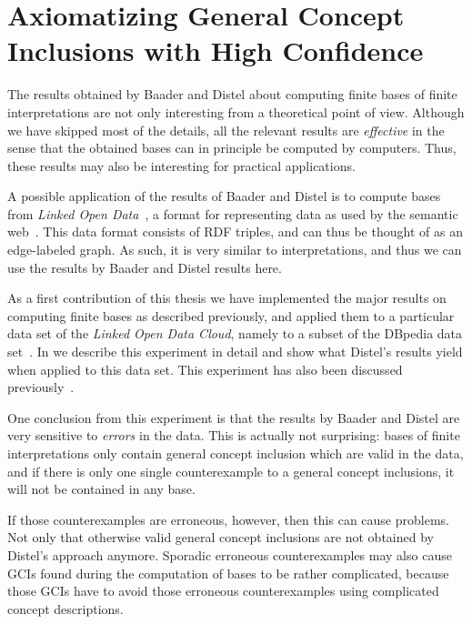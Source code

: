 \chapter{Axiomatizing General Concept Inclusions with High Confidence}
\label{cha:axiom-conf-el}

The results obtained by Baader and Distel about computing finite bases of finite
interpretations are not only interesting from a theoretical point of view.  Although we
have skipped most of the details, all the relevant results are \emph{effective} in the
sense that the obtained bases can in principle be computed by computers.  Thus, these
results may also be interesting for practical applications.

A possible application of the results of Baader and Distel is to compute bases from
\emph{Linked Open Data}~\cite{Linked-Data}, a format for representing data as used by the
semantic web~\cite{journal/sciam/BernersLeeHL01,DBLP:conf/dagstuhl/2003sweb,FOST}.  This
data format consists of RDF triples, and can thus be thought of as an edge-labeled graph.
As such, it is very similar to interpretations, and thus we can use the results by Baader
and Distel results here.

As a first contribution of this thesis we have implemented the major results on computing
finite bases as described previously, and applied them to a particular data set of the
\emph{Linked Open Data Cloud}, namely to a subset of the DBpedia data set~\cite{DBpedia}.
In  we describe this experiment in detail and show what
Distel's results yield when applied to this data set.  This experiment has also been
discussed previously~\cite{Borchmann:confident-GCIs,DBLP:conf/icdm/BorchmannD11}.

One conclusion from this experiment is that the results by Baader and Distel are very
sensitive to \emph{errors} in the data.  This is actually not surprising: bases of finite
interpretations only contain general concept inclusion which are valid in the data, and if
there is only one single counterexample to a general concept inclusions, it will not be
contained in any base.

If those counterexamples are erroneous, however, then this can cause problems.  Not only
that otherwise valid general concept inclusions are not obtained by Distel's approach
anymore.  Sporadic erroneous counterexamples may also cause GCIs found during the
computation of bases to be rather complicated, because those GCIs have to avoid those
erroneous counterexamples using complicated concept descriptions.

